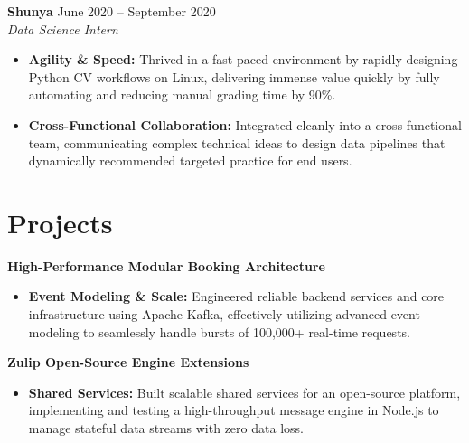 \documentclass[11pt,a4paper]{article}
\begin{document}
\vspace{3pt}
\noindent
\textbf{Shunya} \hfill June 2020 -- September 2020 \\
\textit{Data Science Intern}
\begin{itemize}[leftmargin=*,noitemsep,topsep=0pt]
    \item \textbf{Agility \& Speed:} Thrived in a fast-paced environment by rapidly designing Python CV workflows on Linux, delivering immense value quickly by fully automating and reducing manual grading time by 90\%.
    \item \textbf{Cross-Functional Collaboration:} Integrated cleanly into a cross-functional team, communicating complex technical ideas to design data pipelines that dynamically recommended targeted practice for end users.
\end{itemize}

\vspace{-5pt}
\section{Projects}
\noindent
\textbf{High-Performance Modular Booking Architecture}
\begin{itemize}[leftmargin=*,noitemsep,topsep=0pt]
    \item \textbf{Event Modeling \& Scale:} Engineered reliable backend services and core infrastructure using Apache Kafka, effectively utilizing advanced event modeling to seamlessly handle bursts of 100,000+ real-time requests.
\end{itemize}

\vspace{3pt}
\noindent
\textbf{Zulip Open-Source Engine Extensions}
\begin{itemize}[leftmargin=*,noitemsep,topsep=0pt]
    \item \textbf{Shared Services:} Built scalable shared services for an open-source platform, implementing and testing a high-throughput message engine in Node.js to manage stateful data streams with zero data loss.
\end{itemize}
\end{document}

